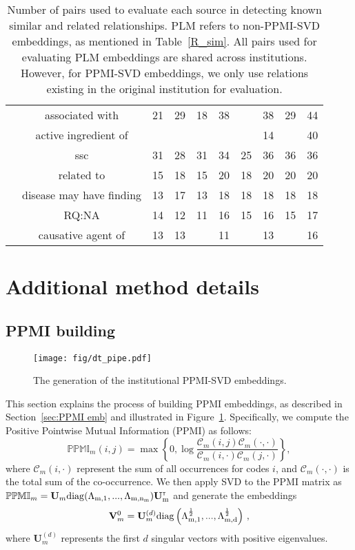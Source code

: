 \documentclass{article}
\def\Csc{\mathcal{C}}
\def\PPMI{\mathbb{PPMI}}
\def\suphalf{^{\scriptscriptstyle \half}}
\def\half{\frac{1}{2}}
\def\V{\mathbf{V}}
\def\U{\mathbf{U}}
\def\trans{^{\scriptscriptstyle \sf T}}
\begin{document}
\begin{table}[H]
{\begin{tabular}{c|c|ccccccc|c}
 & associated with & 21 & 29 & 18 & 38 &  & 38 & 29 & 44\\
 & active ingredient of &  &  &  &  &  & 14 &  & 40\\
 & ssc & 31 & 28 & 31 & 34 & 25 & 36 & 36 & 36\\
 & related to & 15 & 18 & 15 & 20 & 18 & 20 & 20 & 20\\
 & disease may have finding & 13 & 17 & 13 & 18 & 18 & 18 & 18 & 18\\
 & RQ:NA & 14 & 12 & 11 & 16 & 15 & 16 & 15 & 17\\
 & causative agent of & 13 & 13 &  & 11 &  & 13 &  & 16\\
\hline
\end{tabular}
}
\caption{Number of pairs used to evaluate each source in detecting known similar and related relationships. PLM refers to non-PPMI-SVD embeddings, as mentioned in Table~\ref{R_sim}. All pairs used for evaluating PLM embeddings are shared across institutions. However, for PPMI-SVD embeddings, we only use relations existing in the original institution for evaluation.}
\label{num_table}
\end{table}


\section{Additional method details}
\subsection{PPMI building}
\label{supp:ppmi}
\begin{figure}[ht]
    \centering
    \texttt{[image: fig/dt\_pipe.pdf]}
    \caption{The generation of the institutional PPMI-SVD embeddings.}
    \label{fig:PPMI}
\end{figure}
This section explains the process of building PPMI embeddings, as described in Section~\ref{sec:PPMI emb} and illustrated in Figure~\ref{fig:PPMI}. Specifically, we compute the Positive Pointwise Mutual Information (PPMI) as follows:
\begin{equation}
\mathbb{PPMI}_m(i,j) = \max\left\{0, \log\frac{\Csc_m(i,j)\Csc_m(\cdot,\cdot)}{\Csc_m(i,\cdot) \Csc_m(j,\cdot)}\right\},
\label{PPMI_1}
\end{equation}
where $\Csc_m(i,\cdot)$ represent the sum of all occurrences for codes $i$, and $\Csc_m(\cdot,\cdot)$ is the total sum of the co-occurrence. We then apply SVD to the PPMI matrix as $\PPMI_m = \U_m\rm{diag}(\Lambda_{m,1}, ...,\Lambda_{m,n_m})\U_m\trans$ and generate the embeddings
\begin{equation}
    \V_{m}^0 = \U^{(d)}_{m} \rm{diag} \left(\Lambda_{m,1}\suphalf, ..., \Lambda_{m,d}\suphalf \right)\,,
    \label{PPMI_2}
\end{equation}
where $\U^{(d)}_{m}$ represents the first $d$ singular vectors with positive eigenvalues.
\end{document}
